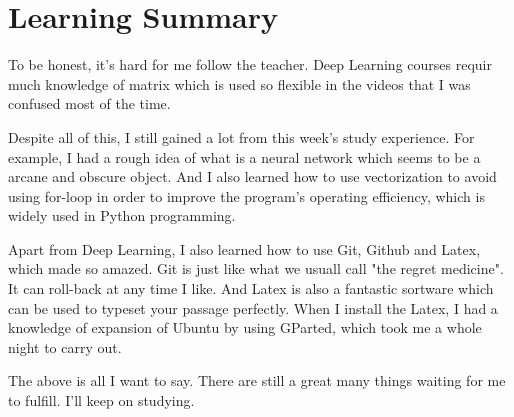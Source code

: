 \documentclass{article}
\begin{document}
\section{Learning Summary}
    To be honest, it's hard for me follow the teacher. Deep Learning courses requir much knowledge of matrix which is used so flexible in the videos that I was confused most of the time.\par
    Despite all of this, I still gained a lot from this week's study experience. For example, I had a rough idea of what is a neural network which seems to be a arcane and obscure object. And I also learned how to use vectorization to avoid using for-loop in order to improve the program's operating efficiency, which is widely used in Python programming.\par
    Apart from Deep Learning, I also learned how to use Git, Github and Latex, which made so amazed. Git is just like what we usuall call "the regret medicine". It can roll-back at any time I like. And Latex is also a fantastic sortware which can be used to typeset your passage perfectly. When I install the Latex, I had a knowledge of expansion of Ubuntu by using GParted, which took me a whole night to carry out.\par
    The above is all I want to say. There are still a great many things waiting for me to fulfill. I'll keep on studying.


 
\end{document}

